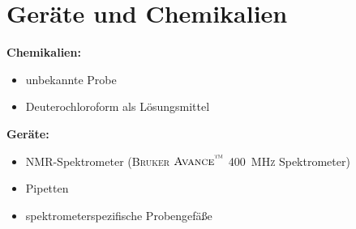 \section{Geräte und Chemikalien}
\label{sec:geraete}

\textbf{Chemikalien:}
\begin{itemize}
	\item unbekannte Probe
	\item Deuterochloroform als Lösungsmittel
\end{itemize}

\textbf{Geräte:}
\begin{itemize}
	\item NMR-Spektrometer (\textsc{Bruker $\text{\textsc{Avance}}^{\text{\texttrademark}}$ \SI{400}{\mega \hertz}} Spektrometer)
	\item Pipetten
	\item spektrometerspezifische Probengefäße
\end{itemize}